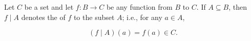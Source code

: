 Let $C$ be a set and let $f : B \to C$ be any function from $B$ to $C$. If $A \subseteq B$, then $f \mid A$ denotes the  of $f$ to the subset $A$; i.e., for any $a \in A$,

$$(f \mid A)(a) = f(a) \in C.$$

